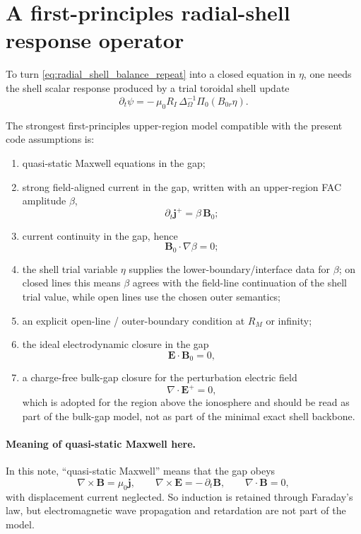 \documentclass[11pt,a4paper]{article}
\begin{document}
\section{A first-principles radial-shell response operator}

To turn \eqref{eq:radial_shell_balance_repeat} into a closed equation in
$\eta$, one needs the shell scalar response produced by a trial toroidal shell
update
\[
\partial_t\psi = -\,\mu_0 R_I\,\Delta_\Omega^{-1}\Pi_0(B_{0r}\eta).
\]

The strongest first-principles upper-region model compatible with the present
code assumptions is:
\begin{enumerate}
\item quasi-static Maxwell equations in the gap;
\item strong field-aligned current in the gap, written with an upper-region FAC
amplitude \(\beta\),
\[
\partial_t \mathbf j^+ = \beta\,\mathbf B_0;
\]
\item current continuity in the gap, hence
\[
\mathbf B_0\cdot\nabla\beta=0;
\]
\item the shell trial variable \(\eta\) supplies the lower-boundary/interface
data for \(\beta\); on closed lines this means \(\beta\) agrees with the
field-line continuation of the shell trial value, while open lines use the
chosen outer semantics;
\item an explicit open-line / outer-boundary condition at $R_M$ or infinity;
\item the ideal electrodynamic closure in the gap
\[
\mathbf E\cdot\mathbf B_0 = 0,
\]
\item a charge-free bulk-gap closure for the perturbation electric field
\[
\nabla\cdot \mathbf E^+ = 0,
\]
which is adopted for the region above the ionosphere and should be read as part
of the bulk-gap model, not as part of the minimal exact shell backbone.
\end{enumerate}

\paragraph{Meaning of quasi-static Maxwell here.}
In this note, ``quasi-static Maxwell'' means that the gap obeys
\[
\nabla\times \mathbf B = \mu_0 \mathbf j,
\qquad
\nabla\times \mathbf E = -\,\partial_t\mathbf B,
\qquad
\nabla\cdot \mathbf B = 0,
\]
with displacement current neglected. So induction is retained through Faraday's
law, but electromagnetic wave propagation and retardation are not part of the
model.
\end{document}
